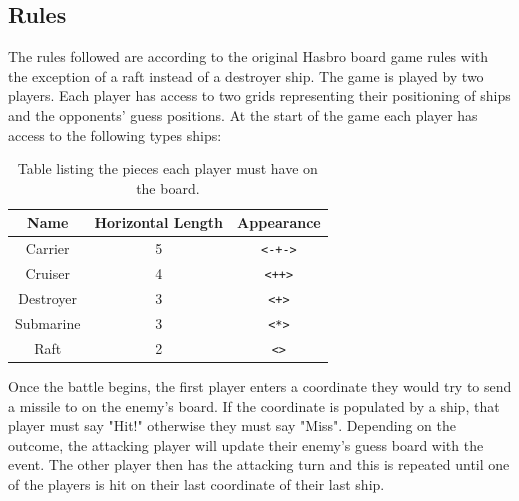 \documentclass[11pt]{article} %
\begin{document}
\subsection{Rules}
The rules followed are according to the original Hasbro board game rules \cite{rules} with the exception of a
raft instead of a destroyer ship.
The game is played by two players.
Each player has access to two grids representing their positioning of ships and the opponents' guess positions.
At the start of the game each player has access to the following types ships:
\begin{table}[!h]
\centering
\begin{tabular}{c|c|c}
Name & Horizontal Length & Appearance \\
\hline
Carrier & 5 & \verb|<-+->| \\
Cruiser & 4 & \verb|<++>| \\
Destroyer & 3 & \verb|<+>| \\
Submarine & 3 & \verb|<*>| \\
Raft & 2 & \verb|<>| \\
\hline
\end{tabular}
\caption{Table listing the pieces each player must have on the board.}
\label{table:pieces}
\end{table}
Once the battle begins, the first player enters a coordinate they would try to send a missile to on the
enemy's board.
If the coordinate is populated by a ship, that player must say "Hit!" otherwise they must say "Miss".
Depending on the outcome, the attacking player will update their enemy's guess board with the event.
The other player then has the attacking turn and this is repeated until one of the players is hit on their last
coordinate of their last ship.
\end{document}
